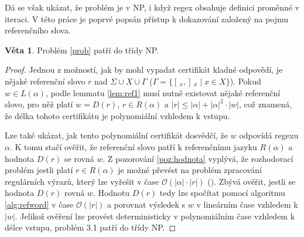 \documentclass[thesis=B,czech]{FITthesis}[2019/12/23]
\theoremstyle{definition}
\newtheorem{theorem}{Věta}[chapter]
\begin{document}
Dá se však ukázat, že problém je v NP, i když regex obsahuje definici proměnné v iteraci. V této práce je poprvé popsán přístup k dokazování založený na pojmu referenčního slova.

\begin{theorem}
Problém \ref{prob} patří do třídy NP.
\end{theorem}
\begin{proof} Jednou z možností, jak by mohl vypadat certifikát kladné odpovědí, je nějaké referenční slovo $r$ nad $\Sigma \cup X \cup \Gamma$ ($\Gamma = \{ [\,_x , ]\,_x \mid x \in X \}$). Pokud $w \in L\left(\alpha\right)$, podle lemmatu \ref{lem:ref1} musí nutně existovat nějaké referenční slovo, pro něž platí $w = D\left(r\right)$, $r \in R\left(\alpha\right)$ a $ |r| \le |\alpha|+|\alpha|^2\cdot|w|$, což znamená, že délka tohoto certifikátu je polynomiální vzhledem k vstupu.

Lze také ukázat, jak tento polynomiální certifikát dosvědčí, že $w$ odpovídá regexu $\alpha$. K tomu stačí ověřit, že referenční slovo patří k referenčnímu jazyku $R\left(\alpha\right)$ a hodnota $D\left(r\right)$ se rovná $w$. Z pozorování \ref{poz:hodnota} vyplývá, že rozhodovací problém jestli platí $r \in R(\alpha)$ je možné převést na problém zpracování regulárních výrazů, který lze vyřešit v čase $\mathcal{O}\left(|\alpha| \cdot |r|\right)$ (\cite[s. 282--285]{alfred2014algorithms}). Zbývá ověřit, jestli se hodnota $D\left(r\right)$ rovná $w$. Hodnotu $D\left(r\right)$ tedy lze spočítat pomocí algoritmu \ref{alg:refword} v čase $\mathcal{O}(|r|)$ a porovnat výsledek s $w$ v lineárním čase vzhledem k $|w|$. Jelikož ověření lze provést deterministicky v polynomiálním čase vzhledem k délce vstupu, problém 3.1 patří do třídy NP.
\end{proof}
\end{document}
